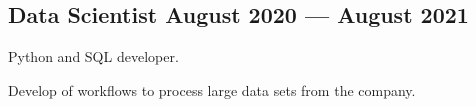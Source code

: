 \documentclass[letter,10pt]{article}
\begin{document}
\subsection{{Data Scientist
\hfill August 2020 --- August 2021}}
\begin{zitemize}
\item Python and SQL developer.
\item Develop of workflows to process large data sets from the company.
\end{zitemize}




\end{document}
